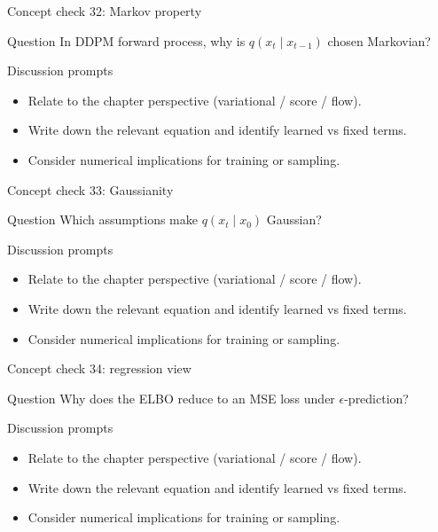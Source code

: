 \documentclass[aspectratio=169]{beamer}
\begin{document}
\begin{frame}{Concept check 32: Markov property}
\begin{block}{Question}
In DDPM forward process, why is \(q(x_t\mid x_{t-1})\) chosen Markovian?
\end{block}
\begin{block}{Discussion prompts}
\begin{itemize}
\item Relate to the chapter perspective (variational / score / flow).
\item Write down the relevant equation and identify learned vs fixed terms.
\item Consider numerical implications for training or sampling.
\end{itemize}
\end{block}
\end{frame}

\begin{frame}{Concept check 33: Gaussianity}
\begin{block}{Question}
Which assumptions make \(q(x_t\mid x_0)\) Gaussian?
\end{block}
\begin{block}{Discussion prompts}
\begin{itemize}
\item Relate to the chapter perspective (variational / score / flow).
\item Write down the relevant equation and identify learned vs fixed terms.
\item Consider numerical implications for training or sampling.
\end{itemize}
\end{block}
\end{frame}

\begin{frame}{Concept check 34: regression view}
\begin{block}{Question}
Why does the ELBO reduce to an MSE loss under \(\epsilon\)-prediction?
\end{block}
\begin{block}{Discussion prompts}
\begin{itemize}
\item Relate to the chapter perspective (variational / score / flow).
\item Write down the relevant equation and identify learned vs fixed terms.
\item Consider numerical implications for training or sampling.
\end{itemize}
\end{block}
\end{frame}
\end{document}
